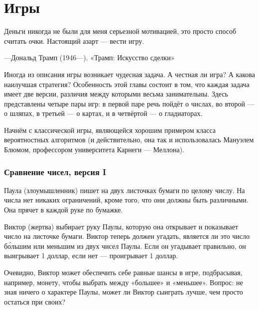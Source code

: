 \chapter*{Игры}

\setlength{\epigraphwidth}{.6\textwidth}
\epigraph{Деньги никогда не были для меня серьезной мотивацией, это просто способ считать очки.
Настоящий азарт --- вести игру.}{---Дональд Трамп (1946---).
«Трамп: Искусство сделки»}

Иногда  из описания игры возникает чудесная задача.
А честная ли игра? А какова наилучшая стратегия? Особенность этой главы состоит в том, что каждая задача имеет две версии, различия между которыми весьма занимательны.
Здесь представлены четыре пары игр: в первой паре речь пойдёт о числах, во второй --- о шляпах, в третьей --- о картах, и в четвёртой --- о гладиаторах.

\medskip

Начнём с классической игры, являющейся  хорошим примером класса вероятностных алгоритмов (и действительно, она так и использовалась Мануэлем Блюмом,  профессором университета Карнеги --- Меллона). %

\subsection*{Сравнение чисел, версия I} %

Паула (злоумышленник) пишет на двух листочках бумаги по целому числу.
На числа нет никаких ограничений, кроме того, что они должны быть различными.
Она прячет в каждой руке по бумажке.

Виктор (жертва) выбирает руку Паулы, которую она открывает и показывает число на листочке бумаги.
Виктор теперь должен угадать, является ли это число б\'{о}льшим или меньшим из двух чисел Паулы.
Если он угадывает правильно, он выигрывает 1 доллар, если нет --- проигрывает 1 доллар.

Очевидно, Виктор может обеспечить себе равные шансы в игре, подбрасывая, например, монету, чтобы выбрать между «большее» и «меньшее».
Вопрос: не зная ничего о характере Паулы, может ли Виктор сыиграть лучше, чем просто остаться при своих?

